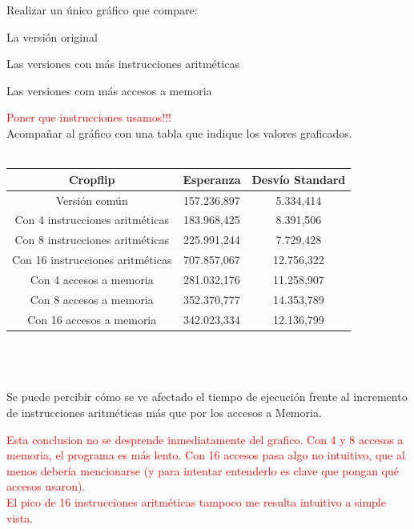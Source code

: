 Realizar un único gráfico que compare:
\begin{inparaenum}
    \item La versión original
    \item Las versiones con más instrucciones aritméticas
    \item Las versiones com más accesos a memoria
\end{inparaenum}
\textcolor{red}{Poner que instrucciones usamos!!!}\\
Acompañar al gráfico con una tabla que indique los valores graficados. \\
\\
 \begin{tabular}[c]{|c|c|c|}
	\hline
		Cropflip & Esperanza & Desv\'io Standard\\
		\hline
Versi\'on com\'un & 157.236,897 & 5.334,414 \\
\hline
Con 4 instrucciones aritméticas & 183.968,425 & 8.391,506 \\
\hline
Con 8 instrucciones aritméticas & 225.991,244 & 7.729,428 \\
\hline
Con 16 instrucciones aritméticas & 707.857,067 & 12.756,322 \\
\hline
Con 4 accesos a memoria & 281.032,176 & 11.258,907 \\
\hline
Con 8 accesos a memoria & 352.370,777 & 14.353,789 \\
\hline
Con 16 accesos a memoria & 342.023,334 & 12.136,799 \\
\hline
	\end{tabular}\\\\
\\
Se puede percibir c\'omo se ve afectado el tiempo de ejecuci\'on frente al incremento de instrucciones aritm\'eticas m\'as que por los accesos a Memoria.
\newpage
\begin{figure}
  \begin{center}
  \end{center}
\end{figure}
\textcolor{red}{Esta conclusion no se desprende inmediatamente del grafico. Con 4 y 8 accesos a memoria, el programa es m\'as lento. Con 16 accesos pasa algo no intuitivo, que al menos deber\'ia mencionarse (y para intentar entenderlo es clave que pongan qu\'e accesos usaron). \\
El pico de 16 instrucciones aritm\'eticas tampoco me resulta intuitivo a simple vista.}
  \newpage

